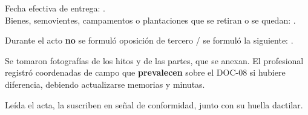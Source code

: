 \documentclass[12pt,a4paper]{article}
\begin{document}
\vspace{0.25em}
\noindent Fecha efectiva de entrega: .\\
Bienes, semovientes, campamentos o plantaciones que se retiran o se quedan: \faltante{[detalle]}.

Durante el acto \textbf{no} se formuló oposición de tercero / se formuló la siguiente: .

Se tomaron fotografías de los hitos y de las partes, que se anexan. El profesional registró coordenadas de campo que \textbf{prevalecen} sobre el DOC-08 si hubiere diferencia, debiendo actualizarse memorias y minutas.

Leída el acta, la suscriben en señal de conformidad, junto con su huella dactilar.

\LugarFecha
{}

\vspace{0.55em}
\noindent
{}
\hfill
{}

\vspace{0.45em}
\noindent
{}

\vspace{0.7em}
\\
\noindent{}
\end{document}
